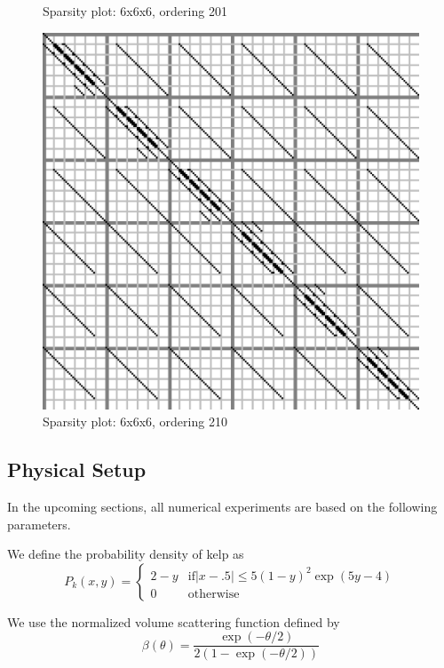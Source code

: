 \documentclass[10pt]{article}
\newcommand\abs[1]{\left| #1 \right|}
\begin{document}
\begin{multicols}{2}
\begin{center}
\begin{minipage}[t]{.5\textwidth}
\begin{figure}[H]
    \caption{Sparsity plot: 6x6x6, ordering 201 }
\end{figure}
\vspace{\spmgin}
\begin{figure}[H]
    \centering
    \includegraphics[width=\spwidth]{../img/sparsity/int_small_6x6x6_210.eps}
    \caption{Sparsity plot: 6x6x6, ordering 210 }
\end{figure}
\end{minipage}%
\end{center}
\pagebreak


\subsection{Physical Setup}
\label{sec:setup}
In the upcoming sections, all numerical experiments are based on the following parameters.

We define the probability density of kelp as 
\begin{equation}
	P_k(x,y) =
	\begin{cases}
		2-y & \mbox{if} \abs{x-.5} \leq 5(1-y)^2\exp(5y-4) \\
		0 & \mbox{otherwise}
	\end{cases}
\end{equation}

We use the normalized volume scattering function defined by
\begin{equation}
	\beta(\theta) = \frac{\exp(-\theta/2)}{2\left(1-\exp(-\theta/2)\right)}
\end{equation}


\end{multicols}
\end{document}
